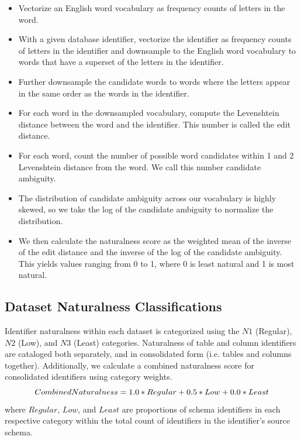 \begin{itemize}
  \item Vectorize an English word vocabulary as frequency counts of letters in the word.
  \item With a given database identifier, vectorize the identifier as frequency counts of letters in the identifier and downsample to the English word vocabulary to words that have a superset of the letters in the identifier.
  \item Further downsample the candidate words to words where the letters appear in the same order as the words in the identifier.
  \item For each word in the downsampled vocabulary, compute the Levenshtein distance between the word and the identifier. This number is called the edit distance.
  \item For each word, count the number of possible word candidates within 1 and 2 Levenshtein distance from the word. We call this number candidate ambiguity.
  \item The distribution of candidate ambiguity across our vocabulary is highly skewed, so we take the log of the candidate ambiguity to normalize the distribution.
  \item We then calculate the naturalness score as the weighted mean of the inverse of the edit distance and the inverse of the log of the candidate ambiguity. This yields values ranging from 0 to 1, where 0 is least natural and 1 is most natural.
\end{itemize}


\subsection{Dataset Naturalness Classifications}

Identifier naturalness within each dataset is categorized using the $N1$ (Regular), $N2$ (Low), and $N3$ (Least) categories.
Naturalness of table and column identifiers are cataloged both separately, and in consolidated form (i.e. tables and columns together).
Additionally, we calculate a combined naturalness score for consolidated identifiers using category weights.
\begin{equation}
  $$CombinedNaturalness = 1.0*Regular + 0.5*Low + 0.0*Least$$ 
  \label{equation:combined-naturalness}
\end{equation}
where $Regular$, $Low$, and $Least$ are proportions of schema identifiers in each respective category within the total count of identifiers in the identifier's source schema.

